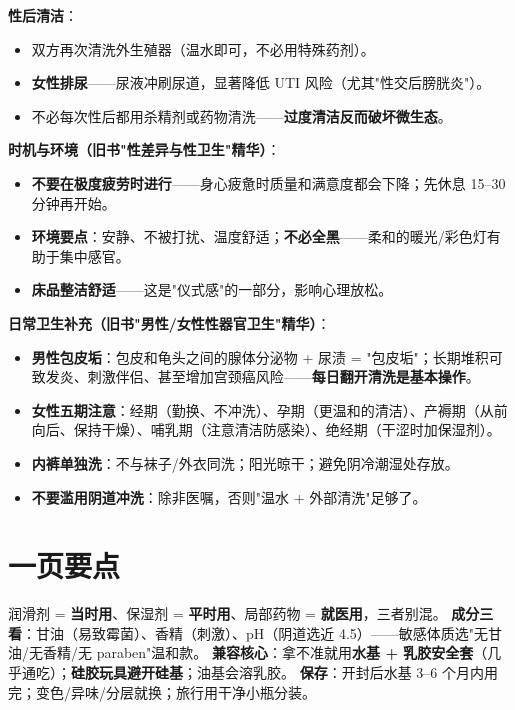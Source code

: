 \documentclass[12pt,UTF8,openany]{ctexbook}
\begin{document}
\textbf{性后清洁}：

\begin{itemize}[leftmargin=2em,itemsep=0.3em]
  \item 双方再次清洗外生殖器（温水即可，不必用特殊药剂）。
  \item \textbf{女性排尿}——尿液冲刷尿道，显著降低 UTI 风险（尤其"性交后膀胱炎"）。
  \item 不必每次性后都用杀精剂或药物清洗——\textbf{过度清洁反而破坏微生态}。
\end{itemize}

\textbf{时机与环境（旧书"性差异与性卫生"精华）}：

\begin{itemize}[leftmargin=2em,itemsep=0.3em]
  \item \textbf{不要在极度疲劳时进行}——身心疲惫时质量和满意度都会下降；先休息 15--30 分钟再开始。
  \item \textbf{环境要点}：安静、不被打扰、温度舒适；\textbf{不必全黑}——柔和的暖光/彩色灯有助于集中感官。
  \item \textbf{床品整洁舒适}——这是"仪式感"的一部分，影响心理放松。
\end{itemize}

\textbf{日常卫生补充（旧书"男性/女性性器官卫生"精华）}：

\begin{itemize}[leftmargin=2em,itemsep=0.3em]
  \item \textbf{男性包皮垢}：包皮和龟头之间的腺体分泌物 + 尿渍 = "包皮垢"；长期堆积可致发炎、刺激伴侣、甚至增加宫颈癌风险——\textbf{每日翻开清洗是基本操作}。
  \item \textbf{女性五期注意}：经期（勤换、不冲洗）、孕期（更温和的清洁）、产褥期（从前向后、保持干燥）、哺乳期（注意清洁防感染）、绝经期（干涩时加保湿剂）。
  \item \textbf{内裤单独洗}：不与袜子/外衣同洗；阳光晾干；避免阴冷潮湿处存放。
  \item \textbf{不要滥用阴道冲洗}：除非医嘱，否则"温水 + 外部清洗"足够了。
\end{itemize}

\section{一页要点}
润滑剂 = \textbf{当时用}、保湿剂 = \textbf{平时用}、局部药物 = \textbf{就医用}，三者别混。
\textbf{成分三看}：甘油（易致霉菌）、香精（刺激）、pH（阴道选近 4.5）——敏感体质选"无甘油/无香精/无 paraben"温和款。
\textbf{兼容核心}：拿不准就用\textbf{水基 + 乳胶安全套}（几乎通吃）；\textbf{硅胶玩具避开硅基}；油基会溶乳胶。
\textbf{保存}：开封后水基 3--6 个月内用完；变色/异味/分层就换；旅行用干净小瓶分装。
\end{document}
